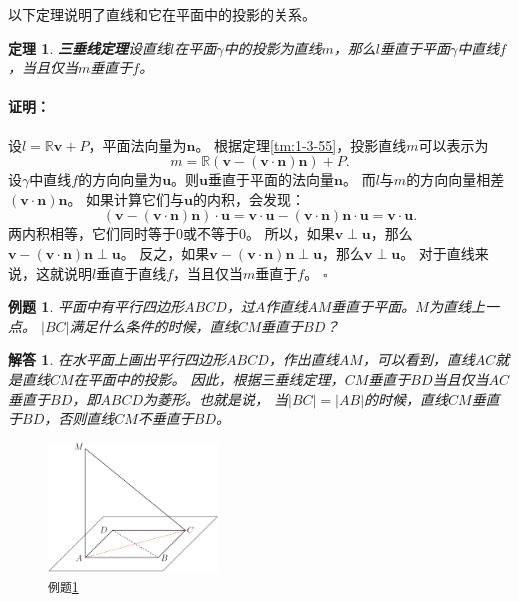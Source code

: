 \documentclass[12pt,UTF8]{ctexbook}
\newtheorem{tm}{定理}[section]
\newtheorem{et}{例题}[section]
\renewenvironment{proof}{\paragraph{\textbf{证明：}}}{\hfill$\square$}
\newtheorem*{so}{解答}
\begin{document}
以下定理说明了直线和它在平面中的投影的关系。
\begin{tm}{\textbf{三垂线定理}}\label{tm:1-3-57}
    设直线$l$在平面$\gamma$中的投影为直线$m$，那么$l$垂直于平面$\gamma$中直线$f$，当且仅当$m$垂直于$f$。
\end{tm}
\begin{proof}
    设$l=\mathbb{R}\mathbf{v}+P$，平面法向量为$\mathbf{n}$。
    根据定理\ref{tm:1-3-55}，投影直线$m$可以表示为
    $$m = \mathbb{R}(\mathbf{v} - (\mathbf{v}\cdot\mathbf{n})\mathbf{n}) + P.$$
    设$\gamma$中直线$f$的方向向量为$\mathbf{u}$。则$\mathbf{u}$垂直于平面的法向量$\mathbf{n}$。
    而$l$与$m$的方向向量相差$(\mathbf{v}\cdot\mathbf{n})\mathbf{n}$。
    如果计算它们与$\mathbf{u}$的内积，会发现：
    $$ (\mathbf{v} - (\mathbf{v}\cdot\mathbf{n})\mathbf{n})\cdot \mathbf{u} = \mathbf{v} \cdot \mathbf{u} - (\mathbf{v}\cdot\mathbf{n})\mathbf{n} \cdot \mathbf{u} = \mathbf{v} \cdot \mathbf{u}. $$
    两内积相等，它们同时等于$0$或不等于$0$。
    所以，如果$\mathbf{v} \perp \mathbf{u}$，那么$\mathbf{v} - (\mathbf{v}\cdot\mathbf{n})\mathbf{n} \perp \mathbf{u}$。
    反之，如果$\mathbf{v} - (\mathbf{v}\cdot\mathbf{n})\mathbf{n} \perp \mathbf{u}$，那么$\mathbf{v} \perp \mathbf{u}$。
    对于直线来说，这就说明$l$垂直于直线$f$，当且仅当$m$垂直于$f$。
\end{proof}

\begin{et}\label{et:1-3-10}
    平面中有平行四边形$ABCD$，过$A$作直线$AM$垂直于平面。$M$为直线上一点。
    $|BC|$满足什么条件的时候，直线$CM$垂直于$BD$？
\end{et}
\begin{so}
    在水平面上画出平行四边形$ABCD$，作出直线$AM$，可以看到，直线$AC$就是直线$CM$在平面中的投影。
    因此，根据三垂线定理，$CM$垂直于$BD$当且仅当$AC$垂直于$BD$，即$ABCD$为菱形。也就是说，
    当$|BC|=|AB|$的时候，直线$CM$垂直于$BD$，否则直线$CM$不垂直于$BD$。
\end{so}

\begin{figure} %
    \vspace{-45pt}
    \flushright
    \includegraphics[width=0.4\textwidth]{垂线例10.png}
    \caption*{\texttt{例题}\ref{et:1-3-10}}
\end{figure}
\end{document}

